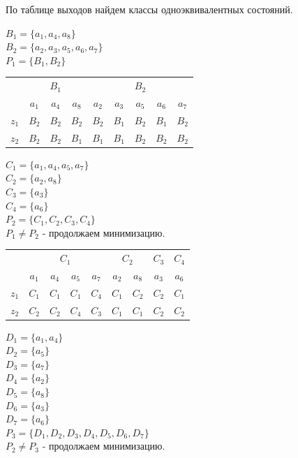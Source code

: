 \documentclass[12pt, a4paper]{article}
\begin{document}
По таблице выходов найдем классы одноэквивалентных состояний.

\noindent
$B_1 = \{a_1, a_4, a_8\}$\\
$B_2 = \{a_2, a_3, a_5, a_6, a_7\}$\\
$P_1 = \{B_1, B_2\}$

\begin{tabular}{| c | c | c | c | c | c | c | c | c |}
  \hline
  \multirow{2}{*}{} & \multicolumn{3}{|c|}{$B_1$} & \multicolumn{5}{|c|}{$B_2$}\\
  \cline{2-9}
  & $a_1$ & $a_4$ & $a_8$ & $a_2$ & $a_3$ & $a_5$ & $a_6$ & $a_7$\\
  \hline
  $z_1$ & $B_2$ & $B_2$ & $B_2$ & $B_2$ & $B_1$ & $B_2$ & $B_1$ & $B_2$\\
  \hline
  $z_2$ & $B_2$ & $B_2$ & $B_1$ & $B_1$ & $B_1$ & $B_2$ & $B_2$ & $B_2$\\
  \hline
\end{tabular}

\noindent
$C_1 = \{a_1, a_4, a_5, a_7\}$\\
$C_2 = \{a_2, a_8\}$\\
$C_3 = \{a_3\}$\\
$C_4 = \{a_6\}$\\
$P_2 = \{C_1, C_2, C_3, C_4\}$\\
$P_1 \ne P_2$ - продолжаем минимизацию.

\begin{tabular}{| c | c | c | c | c | c | c | c | c |}
  \hline
  \multirow{2}{*}{} & \multicolumn{4}{|c|}{$C_1$} & \multicolumn{2}{|c|}{$C_2$} & $C_3$ & $C_4$\\
  \cline{2-9}
  & $a_1$ & $a_4$ & $a_5$ & $a_7$ & $a_2$ & $a_8$ & $a_3$ & $a_6$\\
  \hline
  $z_1$ & $C_1$ & $C_1$ & $C_1$ & $C_4$ & $C_1$ & $C_2$ & $C_2$ & $C_1$\\
  \hline
  $z_2$ & $C_2$ & $C_2$ & $C_4$ & $C_3$ & $C_1$ & $C_1$ & $C_2$ & $C_2$\\
  \hline
\end{tabular}

\noindent
$D_1 = \{a_1, a_4\}$\\
$D_2 = \{a_5\}$\\
$D_3 = \{a_7\}$\\
$D_4 = \{a_2\}$\\
$D_5 = \{a_8\}$\\
$D_6 = \{a_3\}$\\
$D_7 = \{a_6\}$\\
$P_3 = \{D_1, D_2, D_3, D_4, D_5, D_6, D_7\}$\\
$P_2 \ne P_3$ - продолжаем минимизацию.
\end{document}
